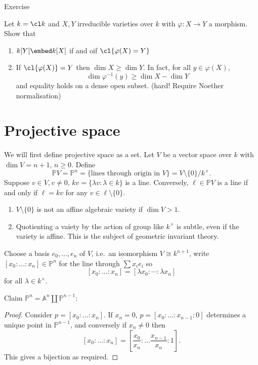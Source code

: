 \documentclass[a4paper]{article}
\renewcommand{\A}{\mathbb{A}}
\renewcommand*{\P}{\mathbb{P}}
\begin{document}
Exercise

Let \(k = \cl k\)  and \(X, Y\) irreducible varieties over \(k\) with \(\varphi: X \to Y\) a morphism. Show that
\begin{enumerate}
\item \(k[Y] \embed k[X]\) if and oif \(\cl{\varphi(X) = Y}\) 
\item If \(\cl{\varphi(X)} = Y\) then \(\dim X \geq \dim Y\). In fact, for all \(y \in \varphi(X)\),
  \[
    \dim \varphi^{-1}(y) \geq \dim X - \dim Y
  \]
  and equality holds on a dense open subset. (hard! Require Noether normalisation)
\end{enumerate}

\section{Projective space}

We will first define projective space as a set. Let \(V\) be a vector space over \(k\) with \(\dim V = n + 1\), \(n \geq 0\). Define
\[
  \P V = \P^n = \{\text{lines through origin in } V\} = V \setminus \{0\}/k^\times.
\]
Suppose \(v \in V, v \neq 0\), \(kv = \{\lambda v: \lambda \in k\}\) is a line. Conversely, \(\ell \in \P V\) is a line if and only if \(\ell = kv\) for any \(v \in \ell \setminus \{0\}\).

\begin{note}\leavevmode
  \begin{enumerate}
  \item \(V \setminus \{0\}\) is not an affine algebraic variety if \(\dim V > 1\).
  \item Quotienting a vaiety by the action of group like \(k^\times\) is subtle, even if the variety is affine. This is the subject of geometric invariant theory.
  \end{enumerate}
\end{note}

Choose a basis \(e_0, \dots, e_n\) of \(V\), i.e.\ an isomorphism \(V \cong k^{n + 1}\), write \([x_0 : \dots : x_n] \in \P^n\) for the line through \(\sum x_i e_i\) so
\[
  [x_0: \dots : x_n] = [\lambda x_0 : \cdots : \lambda x_n]
\]
for all \(\lambda \in k^\times\).

Claim \(\P^n = \A^n \amalg \P^{n - 1}\):

\begin{proof}
  Consider \(p = [x_0 : \dots : x_n]\). If \(x_n = 0\), \(p = [x_0 : \dots : x_{n - 1} : 0]\) determines a unique point in \(\P^{n - 1}\), and conversely if \(x_n \neq 0\) then
  \[
    [x_0 : \dots : x_n] = [\frac{x_0}{x_n} : \dots \frac{x_{n - 1}}{x_n} : 1].
  \]
  This gives a bijection as required.
\end{proof}
\end{document}

